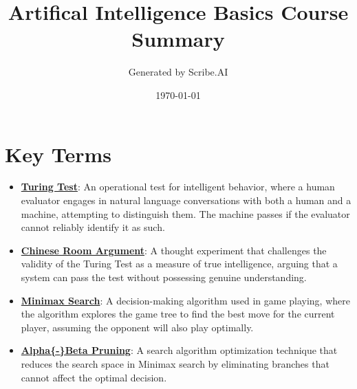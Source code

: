 \documentclass{article}%
\title{Artifical Intelligence Basics Course Summary}%
\author{Generated by Scribe.AI}%
\date{\today}%
\begin{document}
%
\normalsize%
\maketitle%
\section{Key Terms}%
\label{sec:KeyTerms}%
\begin{itemize}[leftmargin=*]%
\item \href{https://purdue.brightspace.com/d2l/common/assets/pdfjs-d2l-dist/1.0.14-legacy/web/viewer.html?file=\%2Fcontent\%2Fenforced\%2F1095467-wl.202510.CS.24300.001\%2F02L2-Intro.pdf\%3Fou\%3D1095467\&lang=en-us\&container=d2l-fileviewer-rendered-pdf\&fullscreen=d2l-fileviewer-rendered-pdf-dialog\&height=667#page=6}{\textbf{Turing Test}}: An operational test for intelligent behavior, where a human evaluator engages in natural language conversations with both a human and a machine, attempting to distinguish them. The machine passes if the evaluator cannot reliably identify it as such.%
\item \href{https://purdue.brightspace.com/d2l/common/assets/pdfjs-d2l-dist/1.0.14-legacy/web/viewer.html?file=\%2Fcontent\%2Fenforced\%2F1095467-wl.202510.CS.24300.001\%2F02L2-Intro.pdf\%3Fou\%3D1095467\&lang=en-us\&container=d2l-fileviewer-rendered-pdf\&fullscreen=d2l-fileviewer-rendered-pdf-dialog\&height=667#page=7}{\textbf{Chinese Room Argument}}: A thought experiment that challenges the validity of the Turing Test as a measure of true intelligence, arguing that a system can pass the test without possessing genuine understanding.%
\item \href{https://purdue.brightspace.com/d2l/common/assets/pdfjs-d2l-dist/1.0.14-legacy/web/viewer.html?file=\%2Fcontent\%2Fenforced\%2F1095467-wl.202510.CS.24300.001\%2F02L2-Intro.pdf\%3Fou\%3D1095467\&lang=en-us\&container=d2l-fileviewer-rendered-pdf\&fullscreen=d2l-fileviewer-rendered-pdf-dialog\&height=667#page=22}{\textbf{Minimax Search}}: A decision{-}making algorithm used in game playing, where the algorithm explores the game tree to find the best move for the current player, assuming the opponent will also play optimally.%
\item \href{https://purdue.brightspace.com/d2l/common/assets/pdfjs-d2l-dist/1.0.14-legacy/web/viewer.html?file=\%2Fcontent\%2Fenforced\%2F1095467-wl.202510.CS.24300.001\%2F02L2-Intro.pdf\%3Fou\%3D1095467\&lang=en-us\&container=d2l-fileviewer-rendered-pdf\&fullscreen=d2l-fileviewer-rendered-pdf-dialog\&height=667#page=23}{\textbf{Alpha\{{-}\}Beta Pruning}}: A search algorithm optimization technique that reduces the search space in Minimax search by eliminating branches that cannot affect the optimal decision.%

\end{itemize}
\end{document}
